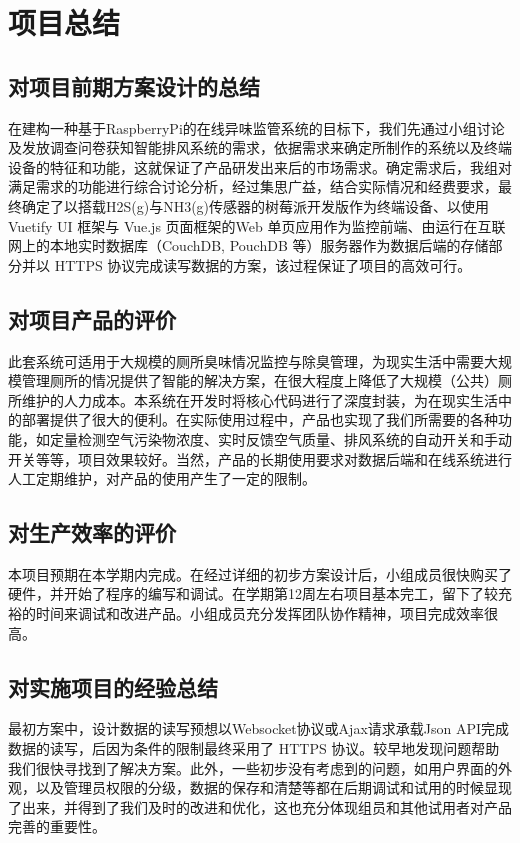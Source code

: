 \documentclass[degree=course]{sjtuthesis}
\begin{document}
\chapter{项目总结}
\section{对项目前期方案设计的总结}
在建构一种基于RaspberryPi的在线异味监管系统的目标下，我们先通过小组讨论及发放调查问卷获知智能排风系统的需求，依据需求来确定所制作的系统以及终端设备的特征和功能，这就保证了产品研发出来后的市场需求。确定需求后，我组对满足需求的功能进行综合讨论分析，经过集思广益，结合实际情况和经费要求，最终确定了以搭载H2S(g)与NH3(g)传感器的树莓派开发版作为终端设备、以使用 Vuetify UI 框架与 Vue.js 页面框架的Web 单页应用作为监控前端、由运行在互联网上的本地实时数据库（CouchDB, PouchDB 等）服务器作为数据后端的存储部分并以 HTTPS 协议完成读写数据的方案，该过程保证了项目的高效可行。

\section{对项目产品的评价}
此套系统可适用于大规模的厕所臭味情况监控与除臭管理，为现实生活中需要大规模管理厕所的情况提供了智能的解决方案，在很大程度上降低了大规模（公共）厕所维护的人力成本。本系统在开发时将核心代码进行了深度封装，为在现实生活中的部署提供了很大的便利。在实际使用过程中，产品也实现了我们所需要的各种功能，如定量检测空气污染物浓度、实时反馈空气质量、排风系统的自动开关和手动开关等等，项目效果较好。当然，产品的长期使用要求对数据后端和在线系统进行人工定期维护，对产品的使用产生了一定的限制。

\section{对生产效率的评价}
本项目预期在本学期内完成。在经过详细的初步方案设计后，小组成员很快购买了硬件，并开始了程序的编写和调试。在学期第12周左右项目基本完工，留下了较充裕的时间来调试和改进产品。小组成员充分发挥团队协作精神，项目完成效率很高。

\section{对实施项目的经验总结}
最初方案中，设计数据的读写预想以Websocket协议或Ajax请求承载Json API完成数据的读写，后因为条件的限制最终采用了 HTTPS 协议。较早地发现问题帮助我们很快寻找到了解决方案。此外，一些初步没有考虑到的问题，如用户界面的外观，以及管理员权限的分级，数据的保存和清楚等都在后期调试和试用的时候显现了出来，并得到了我们及时的改进和优化，这也充分体现组员和其他试用者对产品完善的重要性。
\end{document}
